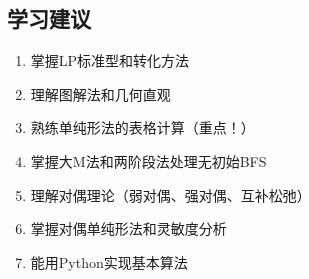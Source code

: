 \subsection{学习建议}

\begin{notebox}[LP学习路径]
\begin{enumerate}
    \item 掌握LP标准型和转化方法
    \item 理解图解法和几何直观
    \item 熟练单纯形法的表格计算（重点！）
    \item 掌握大M法和两阶段法处理无初始BFS
    \item 理解对偶理论（弱对偶、强对偶、互补松弛）
    \item 掌握对偶单纯形法和灵敏度分析
    \item 能用Python实现基本算法
\end{enumerate}
\end{notebox}

\newpage

